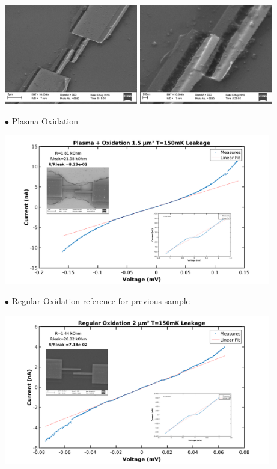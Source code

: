 \documentclass{beamer}
\begin{document}
\begin{frame}[allowframebreaks]
       \includegraphics[width=165pt]{tilt1.png}
       \includegraphics[width=165pt]{tilt2.png}
        \vspace{3cm}
        
        $\bullet$ Plasma Oxidation
        \vspace{0.3cm}
        
        \includegraphics[width=330pt]{PlasmaOx.png}
        \vspace{1cm}
        
        $\bullet$ Regular Oxidation reference for previous sample
        
        \centering
        \includegraphics[width=330pt]{RegularOxRef.png}
        \vspace{1cm}

    \end{frame}
    
\end{document}

